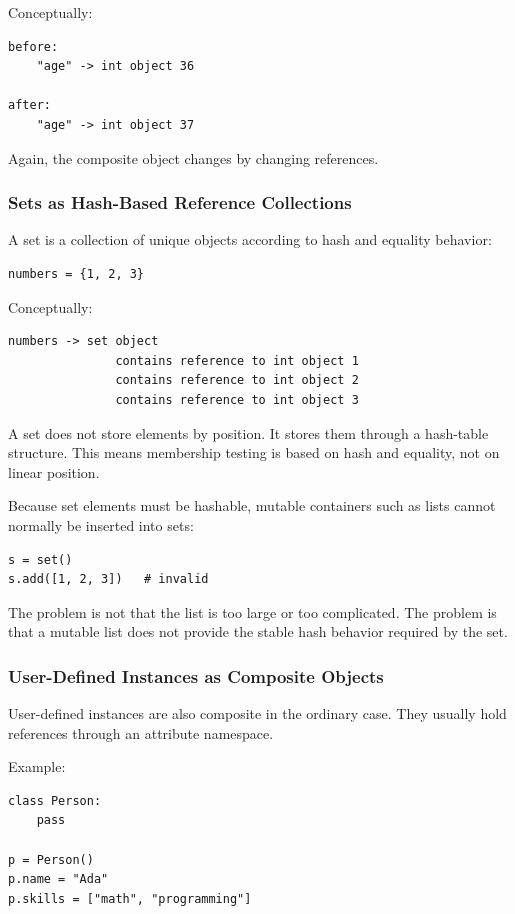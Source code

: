 Conceptually:

\begin{verbatim}
before:
    "age" -> int object 36

after:
    "age" -> int object 37
\end{verbatim}

Again, the composite object changes by changing references.

\subsubsection*{Sets as Hash-Based Reference Collections}

A set is a collection of unique objects according to hash and equality behavior:

\begin{verbatim}
numbers = {1, 2, 3}
\end{verbatim}

Conceptually:

\begin{verbatim}
numbers -> set object
               contains reference to int object 1
               contains reference to int object 2
               contains reference to int object 3
\end{verbatim}

A set does not store elements by position. It stores them through a hash-table structure. This means membership testing is based on hash and equality, not on linear position.

Because set elements must be hashable, mutable containers such as lists cannot normally be inserted into sets:

\begin{verbatim}
s = set()
s.add([1, 2, 3])   # invalid
\end{verbatim}

The problem is not that the list is too large or too complicated. The problem is that a mutable list does not provide the stable hash behavior required by the set.

\subsubsection*{User-Defined Instances as Composite Objects}

User-defined instances are also composite in the ordinary case. They usually hold references through an attribute namespace.

Example:

\begin{verbatim}
class Person:
    pass

p = Person()
p.name = "Ada"
p.skills = ["math", "programming"]
\end{verbatim}

